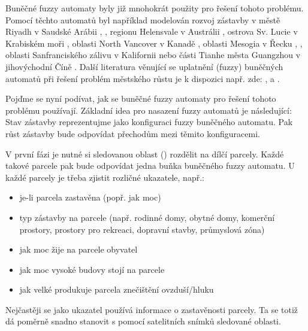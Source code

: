 \documentclass[a4paper,10pt]{article}
\begin{document}
Buněčné fuzzy automaty byly již mnohokrát použity pro řešení tohoto problému. Pomocí těchto automatů byl například modelován rozvoj zástavby v městě Riyadh v Saudské Arábii \cite{AlAhHep+-ModUrbGroDynUsCelAutGIS}, \cite{Ahm+-CalFuzCelAutModUrbDynSauAr}, regionu Helensvale v Austrálii \cite{War+-StoConCelModUrbGro}, ostrova Sv. Lucie v Krabiském moři \cite{WhiEng-CelAutBasIntDynRegMod}, oblasti North Vancover v Kanadě \cite{LaiDraSch-IntMulEvCelAutMetLanSimMod}, oblasti Mesogia v Řecku \cite{ManHatPra-FuzCelAutBasSheModUrGro+}, \cite{ManHatPra-ModUrbGroUsFuzCelAut}, oblasti Sanfranciského zálivu v Kalifornii \cite{ClaHopHay-SelModCelAutModHistUrbSanFraBayAre} nebo části Tianhe města Guangzhou v jihovýchodní Číně \cite{Wu-CalStoCelAutAppRurUrbLanConv}. %
%
Další literatura věnující se uplatnění (fuzzy) buněčných automatů při řešení problém městského růstu je k dispozici např. zde: \cite{PowSimWhi-HieFuzzPattMatcRegCompLanUseMap}, \cite{Dra-CouFuzSetTheGisBaCelAutLanUseChaMod} a \cite{LiuPhi-DevCelAutModUrbGroIncFuzSetApp}.


Pojďme se nyní podívat, jak se buněčné fuzzy automaty pro řešení tohoto problému používají. Základní idea pro nasazení fuzzy automatů je následující: Stav zástavby reprezentujme jako konfiguraci fuzzy buněčného automatu. Pak růst zástavby bude odpovídat přechodům mezi těmito konfiguracemi.

V první fázi je nutné si sledovanou oblast () rozdělit na dílčí parcely. Každé takové parcele pak bude odpovídat jedna buňka buněčného fuzzy automatu. U každé parcely je třeba zjistit rozličné ukazatele, např.:
\begin{itemize}
 \item je-li parcela zastavěna (popř. jak moc)
 \item typ zástavby na parcele (např. rodinné domy, obytné domy, komerční prostory, prostory pro rekreaci, dopravní stavby, průmyslová zóna)
 \item jak moc žije na parcele obyvatel
 \item jak moc vysoké budovy stojí na parcele
 \item jak velké produkuje parcela znečištění ovzduší/hluku
\end{itemize}
Nejčastěji se jako ukazatel používá informace o zastavěnosti parcely. Ta se totiž dá poměrně snadno stanovit s pomocí satelitních snímků sledované oblasti.
\end{document}

